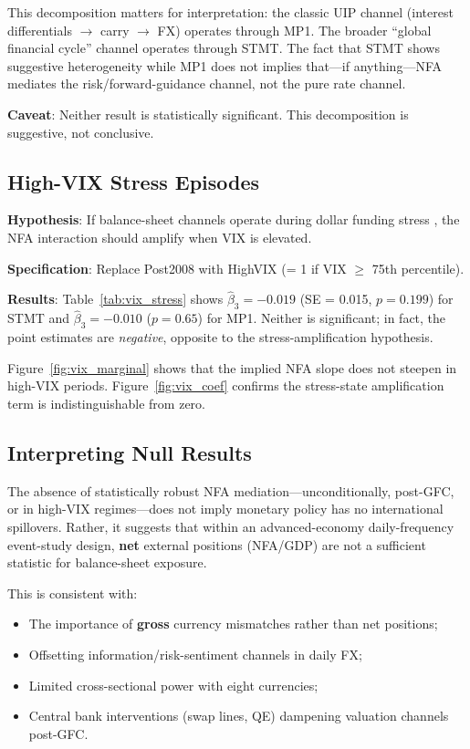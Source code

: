 \documentclass[12pt]{article}
\begin{document}
This decomposition matters for interpretation: the classic UIP channel (interest differentials $\rightarrow$ carry $\rightarrow$ FX) operates through MP1. The broader ``global financial cycle'' channel \citep{rey2015dilemma} operates through STMT. The fact that STMT shows suggestive heterogeneity while MP1 does not implies that---if anything---NFA mediates the risk/forward-guidance channel, not the pure rate channel.

\textbf{Caveat}: Neither result is statistically significant. This decomposition is suggestive, not conclusive.

\subsection{High-VIX Stress Episodes}

\textbf{Hypothesis}: If balance-sheet channels operate during dollar funding stress \citep{bruno2015cross}, the NFA interaction should amplify when VIX is elevated.

\textbf{Specification}: Replace Post2008 with HighVIX (= 1 if VIX $\geq$ 75th percentile).

\textbf{Results}: Table~\ref{tab:vix_stress} shows $\hat{\beta}_3 = -0.019$ (SE = 0.015, $p = 0.199$) for STMT and $\hat{\beta}_3 = -0.010$ ($p = 0.65$) for MP1. Neither is significant; in fact, the point estimates are \textit{negative}, opposite to the stress-amplification hypothesis.

Figure~\ref{fig:vix_marginal} shows that the implied NFA slope does not steepen in high-VIX periods. Figure~\ref{fig:vix_coef} confirms the stress-state amplification term is indistinguishable from zero.

\subsection{Interpreting Null Results}

The absence of statistically robust NFA mediation---unconditionally, post-GFC, or in high-VIX regimes---does not imply monetary policy has no international spillovers. Rather, it suggests that within an advanced-economy daily-frequency event-study design, \textbf{net} external positions (NFA/GDP) are not a sufficient statistic for balance-sheet exposure.

This is consistent with:
\begin{itemize}
    \item The importance of \textbf{gross} currency mismatches rather than net positions;
    \item Offsetting information/risk-sentiment channels in daily FX;
    \item Limited cross-sectional power with eight currencies;
    \item Central bank interventions (swap lines, QE) dampening valuation channels post-GFC.
\end{itemize}
\end{document}
